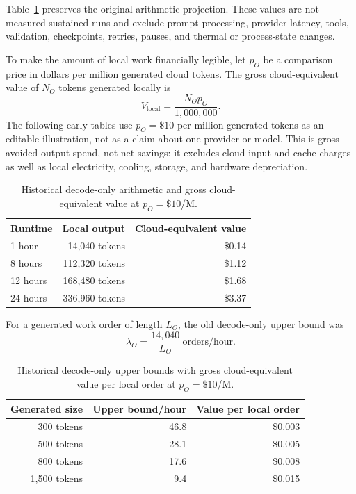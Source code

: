 \documentclass[11pt]{article}
\begin{document}
Table~\ref{tab:cpu-output} preserves the original arithmetic projection. These values are not measured sustained runs and exclude prompt processing, provider latency, tools, validation, checkpoints, retries, pauses, and thermal or process-state changes.

To make the amount of local work financially legible, let $p_O$ be a comparison price in dollars per million generated cloud tokens. The gross cloud-equivalent value of $N_O$ tokens generated locally is
\[
V_{\mathrm{local}} = \frac{N_O p_O}{1{,}000{,}000}.
\]
The following early tables use $p_O=\$10$ per million generated tokens as an editable illustration, not as a claim about one provider or model. This is gross avoided output spend, not net savings: it excludes cloud input and cache charges as well as local electricity, cooling, storage, and hardware depreciation.

\begin{table}[h]
\centering
\caption{Historical decode-only arithmetic and gross cloud-equivalent value at $p_O=\$10$/M.}
\label{tab:cpu-output}
\begin{tabular}{lrr}
\toprule
Runtime & Local output & Cloud-equivalent value \\
\midrule
1 hour & 14,040 tokens & \$0.14 \\
8 hours & 112,320 tokens & \$1.12 \\
12 hours & 168,480 tokens & \$1.68 \\
24 hours & 336,960 tokens & \$3.37 \\
\bottomrule
\end{tabular}
\end{table}

For a generated work order of length $L_O$, the old decode-only upper bound was
\[
\lambda_O = \frac{14{,}040}{L_O}\ \text{orders/hour}.
\]

\begin{table}[h]
\centering
\caption{Historical decode-only upper bounds with gross cloud-equivalent value per local order at $p_O=\$10$/M.}
\begin{tabular}{rrr}
\toprule
Generated size & Upper bound/hour & Value per local order \\
\midrule
300 tokens & 46.8 & \$0.003 \\
500 tokens & 28.1 & \$0.005 \\
800 tokens & 17.6 & \$0.008 \\
1,500 tokens & 9.4 & \$0.015 \\
\bottomrule
\end{tabular}
\end{table}
\end{document}
